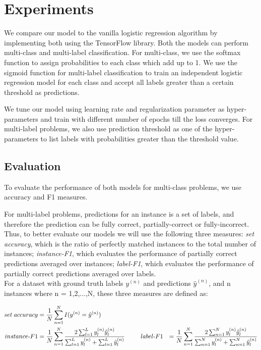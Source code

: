 \newpage
\section{Experiments}


We compare our model to the vanilla logistic regression algorithm by implementing both using the TensorFlow library. Both the models can perform multi-class and multi-label classification. For multi-class, we use the softmax function to assign probabilities to each class which add up to 1. We use the sigmoid function for multi-label classification to train an independent logistic regression model for each class and accept all labels greater than a certain threshold as predictions.

We tune our model using learning rate and regularization parameter as hyper-parameters and train with different number of epochs till the loss converges. For multi-label problems, we also use prediction threshold as one of the hyper-parameters to list labels with probabilities greater than the threshold value.

\subsection{Evaluation}

To evaluate the performance of both models for multi-class problems, we use accuracy and F1 measures.

For multi-label problems, predictions for an instance is a set of labels, and therefore the prediction can be fully correct, partially-correct or fully-incorrect. Thus, to better evaluate our models we will use the following three measures: \textit{set accuracy}, which is the ratio of perfectly matched instances to the total number of instances; \textit{instance-F1}, which evaluates the performance of partially correct predictions averaged over instances; \textit{label-F1}, which evaluates the performance of partially correct predictions averaged over labels.\\

For a dataset with ground truth labels $y^{(n)}$ and predictions $\hat{y}^{(n)}$, and n instances where n = 1,2,...,N, these three measures are defined as:

\begin{alignat}{2}
\label{eq:eval}
set\; accuracy & = \frac{1}{N} \sum_{n=1}^{N} {I(y^{(n)} = \hat{y}^{(n)})}\\
instance \mbox{-} F1 & = \frac{1}{N} \sum_{n=1}^{N} \frac{2\sum_{l=1}^{L} {y^{(n)}_{l} \hat{y}^{(n)}_{l}}}{\sum_{l=1}^{L} {y^{(n)}_{l}} + \sum_{l=1}^{L} {\hat{y}^{(n)}_{l}}}
\hspace{6ex}
label \mbox{-} F1 & = \frac{1}{N} \sum_{n=1}^{N} \frac{2\sum_{n=1}^{N} {y^{(n)}_{l} \hat{y}^{(n)}_{l}}}{\sum_{n=1}^{N} {y^{(n)}_{l}} + \sum_{n=1}^{N} {\hat{y}^{(n)}_{l}}}
\end{alignat}

